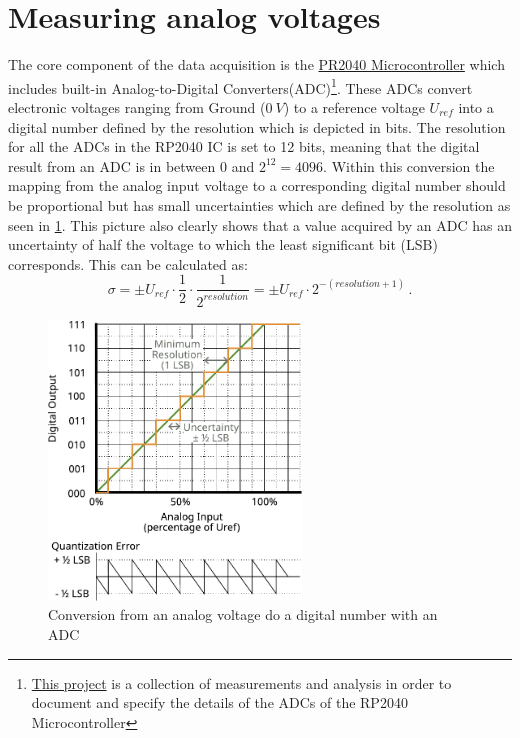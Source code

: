\section{Measuring analog voltages}

The core component of the data acquisition is the \href{https://www.raspberrypi.com/documentation/microcontrollers/rp2040.html}{PR2040 Microcontroller} which includes built-in Analog-to-Digital Converters(ADC)\footnote{\href{http://pico-adc.markomo.me/}{This project} is a collection of measurements and analysis in order to document and specify the details of the ADCs of the RP2040 Microcontroller}. These ADCs convert electronic voltages ranging from Ground ($\SI{0}{V}$) to a reference voltage $U_{ref}$ into a digital number defined by the resolution which is depicted in bits. The resolution for all the ADCs in the RP2040 IC is set to 12 bits, meaning that the digital result from an ADC is in between $0$ and $2^{12} = 4096$. Within this conversion the mapping from the analog input voltage to a corresponding digital number should be proportional but has small uncertainties which are defined by the resolution as seen in \cref{fig:ADC-Curve}. This picture also clearly shows that a value acquired by an ADC has an uncertainty of half the voltage to which the least significant bit (LSB) corresponds. This can be calculated as:
\begin{equation*}
	\sigma = \pm{} U_{ref} \cdot \frac{1}{2} \cdot \frac{1}{2^{resolution}} = \pm{} U_{ref} \cdot 2^{-(resolution + 1)}\,.
\end{equation*}

\begin{figure}[htb]
		\centering
		\includegraphics[width=0.6\textwidth]{./fig/ADC-conversion-curve-export.pdf}
		\caption{Conversion from an analog voltage do a digital number with an ADC}
		\label{fig:ADC-Curve}
\end{figure}

